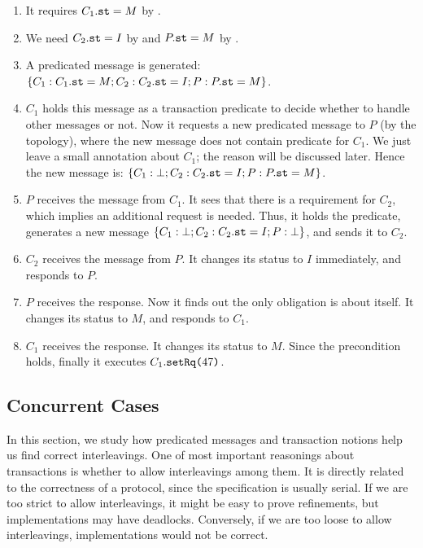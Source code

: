\documentclass[format=manuscript]{acmart}
\begin{document}
\begin{enumerate}
\item It requires $C_1.\texttt{st} = M$ by .
\item We need $C_2.\texttt{st} = I$ by  and $P.\texttt{st} = M$ by
  .
\item A predicated message is generated: $\{ C_1: C_1.\texttt{st} = M; C_2:
  C_2.\texttt{st} = I; P: P.\texttt{st} = M \}$.
\item $C_1$ holds this message as a transaction predicate to decide whether to
  handle other messages or not. Now it requests a new predicated message to $P$
  (by the topology), where the new message does not contain predicate for
  $C_1$. We just leave a small annotation about $C_1$; the reason will be
  discussed later. Hence the new message is: $\{ C_1: \bot; C_2: C_2.\texttt{st} = I;
  P: P.\texttt{st} = M \}$.
\item $P$ receives the message from $C_1$. It sees that there is a requirement
  for $C_2$, which implies an additional request is needed. Thus, it holds the
  predicate, generates a new message $\{ C_1: \bot; C_2: C_2.\texttt{st} = I; P: \bot
  \}$, and sends it to $C_2$.
\item $C_2$ receives the message from $P$. It changes its status to $I$
  immediately, and responds to $P$.
\item $P$ receives the response. Now it finds out the only obligation is about
  itself. It changes its status to $M$, and responds to $C_1$.
\item $C_1$ receives the response. It changes its status to $M$. Since the
  precondition holds, finally it executes $C_1.\texttt{setRq(}47\texttt{)}$.
\end{enumerate}

\subsection{Concurrent Cases}\label{concurrent-cases}

In this section, we study how predicated messages and transaction notions help
us find correct interleavings. One of most important reasonings about
transactions is whether to allow interleavings among them. It is directly
related to the correctness of a protocol, since the specification is usually
serial. If we are too strict to allow interleavings, it might be easy to prove
refinements, but implementations may have deadlocks. Conversely, if we are too
loose to allow interleavings, implementations would not be correct.
\end{document}
